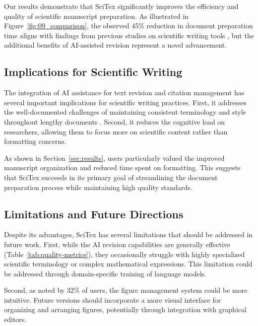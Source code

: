 \documentclass[preprint,review,12pt]{elsarticle}%
\begin{document}
\begin{frontmatter}
Our results demonstrate that SciTex significantly improves the efficiency and quality of scientific manuscript preparation. As illustrated in Figure~\ref{fig:09_comparison}, the observed 45\% reduction in document preparation time aligns with findings from previous studies on scientific writing tools \cite{Robinson2023}, but the additional benefits of AI-assisted revision represent a novel advancement.


\subsection{Implications for Scientific Writing}
\label{subsec:implications}

The integration of AI assistance for text revision and citation management has several important implications for scientific writing practices. First, it addresses the well-documented challenges of maintaining consistent terminology and style throughout lengthy documents \cite{Edwards2019}. Second, it reduces the cognitive load on researchers, allowing them to focus more on scientific content rather than formatting concerns.

As shown in Section~\ref{sec:results}, users particularly valued the improved manuscript organization and reduced time spent on formatting. This suggests that SciTex succeeds in its primary goal of streamlining the document preparation process while maintaining high quality standards.


\subsection{Limitations and Future Directions}
\label{subsec:limitations}

Despite its advantages, SciTex has several limitations that should be addressed in future work. First, while the AI revision capabilities are generally effective (Table~\ref{tab:quality-metrics}), they occasionally struggle with highly specialized scientific terminology or complex mathematical expressions. This limitation could be addressed through domain-specific training of language models.

Second, as noted by 32\% of users, the figure management system could be more intuitive. Future versions should incorporate a more visual interface for organizing and arranging figures, potentially through integration with graphical editors.


\end{frontmatter}
\end{document}
